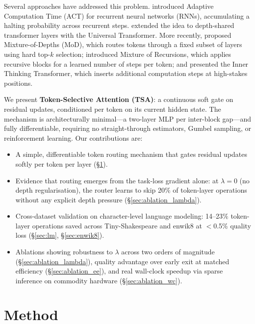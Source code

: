 \documentclass{article}
\begin{document}
Several approaches have addressed this problem. \citet{graves2016act} introduced
Adaptive Computation Time (ACT) for recurrent neural networks (RNNs), accumulating a halting probability across
recurrent steps. \citet{dehghani2019universal} extended the idea to depth-shared
transformer layers with the Universal Transformer. More recently,
\citet{raposo2024mixture} proposed Mixture-of-Depths (MoD), which routes tokens
through a fixed subset of layers using hard top-$k$ selection;
\citet{bae2025mor} introduced Mixture of Recursions, which applies recursive blocks
for a learned number of steps per token; and \citet{chen2025itt} presented the Inner
Thinking Transformer, which inserts additional computation steps at high-stakes
positions.

We present \textbf{Token-Selective Attention (TSA)}: a continuous soft gate on
residual updates, conditioned per token on its current hidden state. The mechanism is
architecturally minimal---a two-layer MLP per inter-block gap---and fully
differentiable, requiring no straight-through estimators, Gumbel sampling, or
reinforcement learning. Our contributions are:
\begin{itemize}
  \item A simple, differentiable token routing mechanism that gates residual
        updates softly per token per layer (\S\ref{sec:method}).
  \item Evidence that routing emerges from the task-loss gradient alone:
        at $\lambda{=}0$ (no depth regularisation), the router learns to
        skip 20\% of token-layer operations without any explicit depth
        pressure (\S\ref{sec:ablation_lambda}).
  \item Cross-dataset validation on character-level language modeling: 14--23\%
        token-layer operations saved across Tiny-Shakespeare and enwik8 at
        $<$0.5\% quality loss (\S\ref{sec:lm}, \S\ref{sec:enwik8}).
  \item Ablations showing robustness to $\lambda$ across two orders of
        magnitude (\S\ref{sec:ablation_lambda}), quality advantage over early
        exit at matched efficiency (\S\ref{sec:ablation_ee}), and real
        wall-clock speedup via sparse inference on commodity hardware
        (\S\ref{sec:ablation_wc}).
\end{itemize}

\section{Method}
\label{sec:method}
\end{document}
